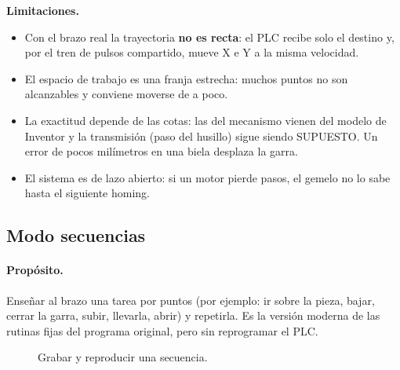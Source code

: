 \documentclass[a4paper,11pt]{article}
\newcommand{\limite}[1]{\par\smallskip\noindent\colorbox{rojo!8}{\parbox{\dimexpr\linewidth-2\fboxsep}{\textbf{\color{rojo}Limitaciones.} #1}}\par\smallskip}
\begin{document}
\limite{\begin{itemize}[leftmargin=5mm, topsep=0pt]
\item Con el brazo real la trayectoria \textbf{no es recta}: el PLC recibe solo el destino y, por el tren de pulsos compartido, mueve X e Y a la misma velocidad.
\item El espacio de trabajo es una franja estrecha: muchos puntos no son alcanzables y conviene moverse de a poco.
\item La exactitud depende de las cotas: las del mecanismo vienen del modelo de Inventor y la transmisión (paso del husillo) sigue siendo SUPUESTO. Un error de pocos milímetros en una biela desplaza la garra.
\item El sistema es de lazo abierto: si un motor pierde pasos, el gemelo no lo sabe hasta el siguiente homing.
\end{itemize}}

\subsection{Modo secuencias}

\paragraph{Propósito.} Enseñar al brazo una tarea por puntos (por ejemplo: ir sobre la pieza, bajar, cerrar la garra, subir, llevarla, abrir) y repetirla. Es la versión moderna de las rutinas fijas del programa original, pero sin reprogramar el PLC.

\begin{figure}[H]
\centering
{}
\caption{Grabar y reproducir una secuencia.}
\end{figure}
\end{document}
